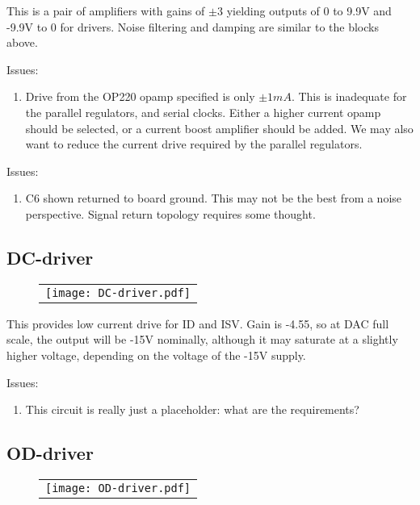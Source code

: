 \documentclass[a4paper,12pt]{article}
\begin{document}
This is a pair of amplifiers with gains of $\pm3$ yielding outputs of 0 to 9.9V and -9.9V to 0 for drivers. Noise filtering and damping are similar to the blocks above.

Issues:
\begin{enumerate}
\item
Drive from the OP220 opamp specified is only $\pm1 mA$. This is inadequate for the parallel regulators, and serial clocks. Either a higher current opamp should be selected, or a current boost amplifier should be added. We may also want to reduce the current drive required by the parallel regulators.
\end{enumerate}

Issues:
\begin{enumerate}
\item
C6 shown returned to board ground. This may not be the best from a noise perspective. Signal return topology requires some thought.
\end{enumerate}



\subsection{DC-driver}
   \begin{figure}
   \begin{center}
   \begin{tabular}{c}
   \texttt{[image: DC-driver.pdf]}
   \end{tabular}
   \end{center}
   \end{figure}

This provides low current drive for ID and ISV. Gain is -4.55, so at DAC full scale, the output will be -15V nominally, although it may saturate at a slightly higher voltage, depending on the voltage of the -15V supply.


Issues:
\begin{enumerate}
\item
This circuit is really just a placeholder: what are the requirements?
\end{enumerate}


\subsection{OD-driver}
   \begin{figure}
   \begin{center}
   \begin{tabular}{c}
   \texttt{[image: OD-driver.pdf]}
   \end{tabular}
   \end{center}
   \end{figure}
\end{document}
